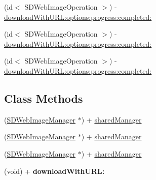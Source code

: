 \begin{DoxyCompactItemize}
\item 
(id$<$ S\+D\+Web\+Image\+Operation $>$) -\/ \mbox{\hyperlink{interface_s_d_web_image_manager_a6ed93377fa34b44c02bce84279529dad}{download\+With\+U\+R\+L\+:options\+:progress\+:completed\+:}}
\item 
(id$<$ S\+D\+Web\+Image\+Operation $>$) -\/ \mbox{\hyperlink{interface_s_d_web_image_manager_a6ed93377fa34b44c02bce84279529dad}{download\+With\+U\+R\+L\+:options\+:progress\+:completed\+:}}
\item 
(id$<$ S\+D\+Web\+Image\+Operation $>$) -\/ \mbox{\hyperlink{interface_s_d_web_image_manager_a6ed93377fa34b44c02bce84279529dad}{download\+With\+U\+R\+L\+:options\+:progress\+:completed\+:}}
\end{DoxyCompactItemize}
\subsection*{Class Methods}
\begin{DoxyCompactItemize}
\item 
(\mbox{\hyperlink{interface_s_d_web_image_manager}{S\+D\+Web\+Image\+Manager}} $\ast$) + \mbox{\hyperlink{interface_s_d_web_image_manager_a03e60850e7f6da2aa38b7db870c93626}{shared\+Manager}}
\item 
(\mbox{\hyperlink{interface_s_d_web_image_manager}{S\+D\+Web\+Image\+Manager}} $\ast$) + \mbox{\hyperlink{interface_s_d_web_image_manager_a5b1936f0aaad5bc7b6cb470f46ac173f}{shared\+Manager}}
\item 
(\mbox{\hyperlink{interface_s_d_web_image_manager}{S\+D\+Web\+Image\+Manager}} $\ast$) + \mbox{\hyperlink{interface_s_d_web_image_manager_a5b1936f0aaad5bc7b6cb470f46ac173f}{shared\+Manager}}
\item 
\mbox{\label{interface_s_d_web_image_manager_a3c23176eb59f5ada330f9a033f1dd730}} 
(void) + {\bfseries download\+With\+U\+R\+L\+:}
\end{DoxyCompactItemize}
